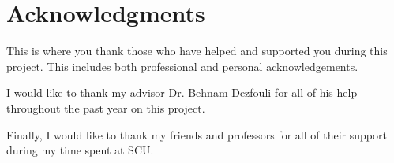 \chapter*{Acknowledgments}

\setlength{\parindent}{4ex}

    This is where you thank those who have helped and supported you during this project. This includes both professional and personal acknowledgements.

    I would like to thank my advisor Dr. Behnam Dezfouli for all of his help throughout the past year on this project. 

    Finally, I would like to thank my friends and professors for all of their support during my time spent at SCU.
